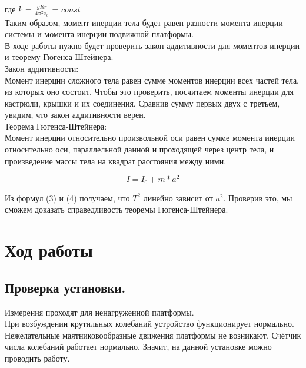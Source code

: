 \documentclass[a4paper]{article}
\begin{document}
\item где $k$ = $\frac{gRr}{4\pi{^2}z_0}$ = $const$\\

Таким образом, момент инерции тела будет равен разности момента инерции системы и момента инерции подвижной платформы.\\



В ходе работы нужно будет проверить закон аддитивности для моментов инерции и теорему Гюгенса-Штейнера.\\

Закон аддитивности:\\
Момент инерции сложного тела равен сумме моментов инерции всех частей тела, из которых оно состоит.
Чтобы это проверить, посчитаем моменты инерции для кастрюли, крышки и их соединения. Сравнив сумму первых двух с третьем, увидим, что закон аддитивности верен.\\

Теорема Гюгенса-Штейнера:\\
Момент инерции относительно произвольной оси равен сумме момента инерции относительно оси, параллельной данной и проходящей через центр тела, и произведение массы тела на квадрат расстояния между ними.

\begin{equation}
	{I} = {I_0} + m * a^2
\end{equation}

Из формул (3) и (4) получаем, что $T^2$ линейно зависит от $a^2$. Проверив это, мы сможем доказать справедливость теоремы Гюгенса-Штейнера.\\

\section{Ход работы}

\subsection{Проверка установки.}

Измерения проходят для ненагруженной платформы.\\

При возбуждении крутильных колебаний устройство функционирует нормально. Нежелательные маятниковообразные движения платформы не возникают. Счётчик числа колебаний работает нормально.
Значит, на данной установке можно проводить работу.\\
\end{document}

